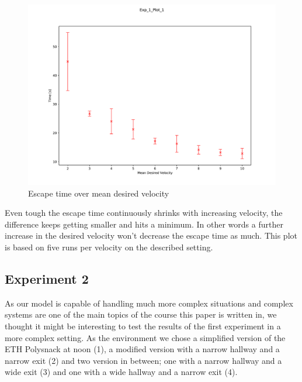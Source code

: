 \documentclass[11pt]{article}
\begin{document}
\begin{figure}[H]
	\centering
	\includegraphics[width=.75\linewidth]{assets/Exp_1_Plot_1}\\
	Escape time over mean desired velocity
\end{figure}

Even tough the escape time continuously shrinks with increasing velocity, the difference keeps getting smaller and hits a minimum. In other words a further increase in the desired velocity won't  decrease the escape time as much. This plot is based on five runs per velocity on the described setting.


\subsection{Experiment 2}

As our model is capable of handling much more complex situations and complex systems are one of the main topics of the course this paper is written in, we  thought it might be interesting to test the results of the first experiment in a more complex setting. As the environment we chose a simplified version of the ETH Polysnack at noon (1), a modified version with a narrow hallway and a narrow exit (2) and two version in between; one with a narrow hallway and a wide exit (3) and one with a wide hallway and a narrow exit (4).
\end{document}
